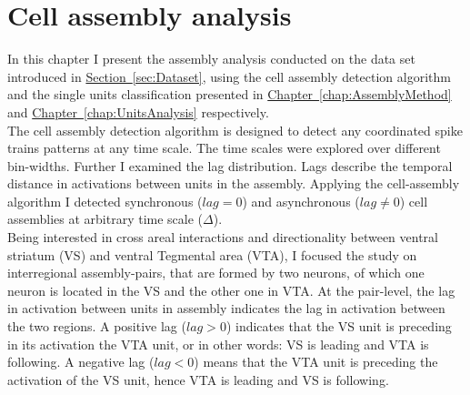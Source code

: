 \chapter{Cell assembly analysis}
\label{chap:AssemblyAnalysis}
In this chapter I present the assembly analysis conducted on the data set introduced in \hyperref[sec:Dataset]{Section~\ref*{sec:Dataset}}, using the cell assembly detection algorithm and the single units classification presented in \hyperref[chap:AssemblyMethod]{Chapter~\ref*{chap:AssemblyMethod}} and \hyperref[chap:UnitsAnalysis]{Chapter~\ref*{chap:UnitsAnalysis}} respectively.\\
The cell assembly detection algorithm is designed to detect any coordinated spike trains patterns at any time scale. The time scales were explored over different bin-widths. Further I examined the lag distribution. Lags describe the temporal distance in activations between units in the assembly. Applying the cell-assembly algorithm I detected synchronous ($lag=0$) and asynchronous ($lag\neq0$) cell assemblies at arbitrary time scale ($\Delta$).\\Being interested in cross areal interactions and directionality between ventral striatum (VS) and ventral Tegmental area (VTA), I focused the study on interregional assembly-pairs, that are formed by two neurons, of which one neuron is located in the VS and the other one in VTA. At the pair-level, the lag in activation between units in assembly indicates the lag in activation between the two regions. A positive lag ($lag>0$) indicates that the VS unit is preceding in its activation the VTA unit, or in other words: VS is leading and VTA is following. A negative lag ($lag<0$) means that the VTA unit is preceding the activation of the VS unit, hence VTA is leading and VS is following.
